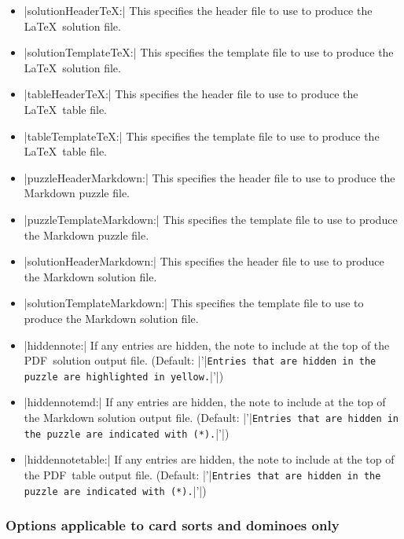 \documentclass{article}
\def\PDF{{\small PDF}}
\begin{document}
\begin{itemize}
  use to produce the \LaTeX\ puzzle file.
\item |solutionHeaderTeX:| This specifies the header file to
  use to produce the \LaTeX\ solution file.
\item |solutionTemplateTeX:| This specifies the template file to
  use to produce the \LaTeX\ solution file.
\item |tableHeaderTeX:| This specifies the header file to
  use to produce the \LaTeX\ table file.
\item |tableTemplateTeX:| This specifies the template file to
  use to produce the \LaTeX\ table file.
\item |puzzleHeaderMarkdown:| This specifies the header file to
  use to produce the Markdown puzzle file.
\item |puzzleTemplateMarkdown:| This specifies the template file to
  use to produce the Markdown puzzle file.
\item |solutionHeaderMarkdown:| This specifies the header file to
  use to produce the Markdown solution file.
\item |solutionTemplateMarkdown:| This specifies the template file to
  use to produce the Markdown solution file.
\item |hiddennote:| If any entries are hidden, the note to include at
  the top of the \PDF\ solution output file.  (Default:
  |'|\texttt{Entries that are hidden in the puzzle are highlighted in
    yellow.}|'|)
\item |hiddennotemd:| If any entries are hidden, the note to include
  at the top of the Markdown solution output file.  (Default:
  |'|\texttt{Entries that are hidden in the puzzle are indicated with
    (*).}|'|)
\item |hiddennotetable:| If any entries are hidden, the note to
  include at the top of the \PDF\ table output file.  (Default:
  |'|\texttt{Entries that are hidden in the puzzle are indicated with
    (*).}|'|)
\end{itemize}

\subsubsection*{Options applicable to card sorts and dominoes only}
\end{document}
